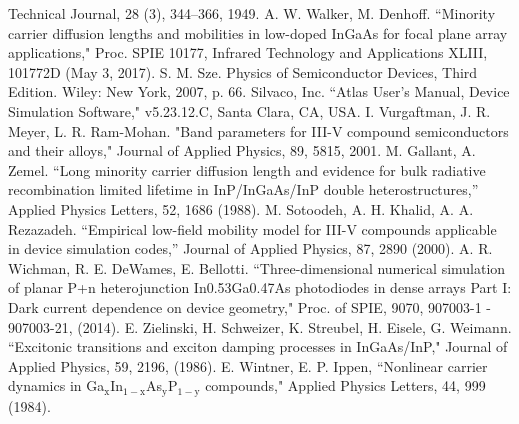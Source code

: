 \documentclass[aip,amsmath,amssymb,reprint]{revtex4-1}
\begin{document}
\begin{thebibliography}{99}
Technical Journal, 28 (3), 344–366, 1949.
 A. W. Walker, M. Denhoff. ``Minority carrier diffusion lengths and mobilities in low-doped InGaAs for focal plane array applications," Proc. SPIE 10177, Infrared Technology and Applications XLIII, 101772D (May 3, 2017).
 S. M. Sze. Physics of Semiconductor Devices, Third Edition. Wiley: New York, 2007, p. 66. 
 Silvaco, Inc. ``Atlas User's Manual, Device Simulation Software," v5.23.12.C, Santa Clara, CA, USA.
 I. Vurgaftman, J. R. Meyer, L. R. Ram-Mohan. "Band parameters for III-V compound semiconductors and their alloys," Journal of Applied Physics, 89, 5815, 2001.
 M. Gallant, A. Zemel. ``Long minority carrier diffusion length and evidence for bulk radiative recombination limited lifetime in InP/InGaAs/InP double heterostructures,'' Applied Physics Letters, 52, 1686 (1988).
 M. Sotoodeh, A. H. Khalid, A. A. Rezazadeh. ``Empirical low-field mobility model for III-V compounds applicable in device simulation codes,'' Journal of Applied Physics, 87, 2890 (2000).
 A. R. Wichman, R. E. DeWames, E. Bellotti. ``Three-dimensional numerical simulation of planar P+n heterojunction In0.53Ga0.47As photodiodes in dense arrays Part I: Dark current dependence on device geometry," Proc. of SPIE, 9070, 907003-1 - 907003-21, (2014).
 E. Zielinski, H. Schweizer, K. Streubel, H. Eisele, G. Weimann. ``Excitonic transitions and exciton damping processes in InGaAs/InP," Journal of Applied Physics, 59, 2196, (1986).
 E. Wintner, E. P. Ippen,
 ``Nonlinear carrier dynamics in
 Ga$_\mathrm{x}$In$_\mathrm{1-x}$As$_\mathrm{y}$P$_\mathrm{1-y}$ compounds,"
 Applied Physics Letters, 44, 999 (1984).  
\end{thebibliography}


\end{document}
